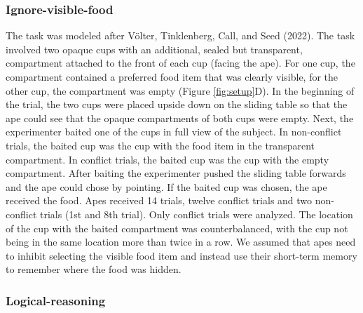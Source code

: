 \documentclass[
  man,floatsintext]{apa6}
\begin{document}
\hypertarget{ignore-visible-food}{%
\subsubsection{Ignore-visible-food}\label{ignore-visible-food}}

The task was modeled after Völter, Tinklenberg, Call, and Seed (2022). The task involved two opaque cups with an additional, sealed but transparent, compartment attached to the front of each cup (facing the ape). For one cup, the compartment contained a preferred food item that was clearly visible, for the other cup, the compartment was empty (Figure \ref{fig:setup}D). In the beginning of the trial, the two cups were placed upside down on the sliding table so that the ape could see that the opaque compartments of both cups were empty. Next, the experimenter baited one of the cups in full view of the subject. In non-conflict trials, the baited cup was the cup with the food item in the transparent compartment. In conflict trials, the baited cup was the cup with the empty compartment. After baiting the experimenter pushed the sliding table forwards and the ape could chose by pointing. If the baited cup was chosen, the ape received the food. Apes received 14 trials, twelve conflict trials and two non-conflict trials (1st and 8th trial). Only conflict trials were analyzed. The location of the cup with the baited compartment was counterbalanced, with the cup not being in the same location more than twice in a row. We assumed that apes need to inhibit selecting the visible food item and instead use their short-term memory to remember where the food was hidden.

\hypertarget{logical-reasoning}{%
\subsubsection{Logical-reasoning}\label{logical-reasoning}}
\end{document}
